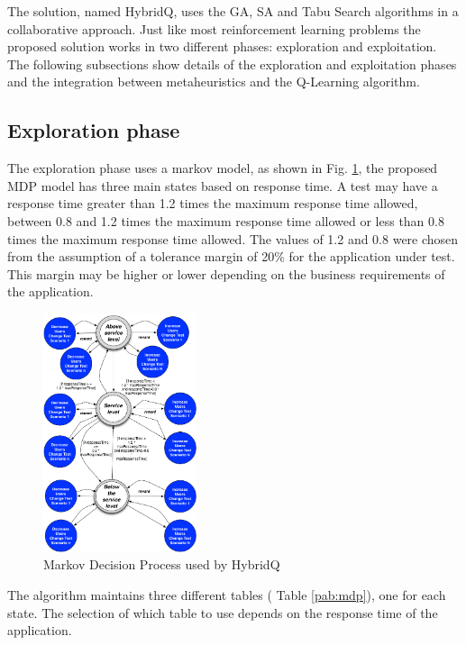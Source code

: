 \documentclass{report}
\begin{document}
The solution, named HybridQ, uses the GA, SA and Tabu Search algorithms in a collaborative approach. Just like most reinforcement learning problems the proposed solution works in two different phases: exploration and exploitation. The following subsections show details of the exploration and exploitation phases and the integration between metaheuristics and the Q-Learning algorithm.


\subsection{Exploration phase}

The exploration phase uses a markov model, as shown in Fig. \ref{fig:mdphybridq}, the proposed MDP model  has three main states based on response time. A test may have a response time greater than 1.2 times the maximum response time allowed, between 0.8 and 1.2 times the maximum response time allowed or less than 0.8 times the maximum response time allowed. The values of 1.2 and 0.8 were chosen from the assumption of a tolerance margin of 20\% for the application under test. This margin may be higher or lower depending on the business requirements of the application.

\begin{figure}[h!]
\center
\includegraphics[width=0.4\textwidth]{./images/mdp3.png}
\caption{Markov Decision Process used by HybridQ}
\label{fig:mdphybridq}
\end{figure}



The algorithm maintains three different tables ( Table \ref{pab:mdp}), one for each state. The selection of which table to use depends on the response time of the application.
\end{document}
